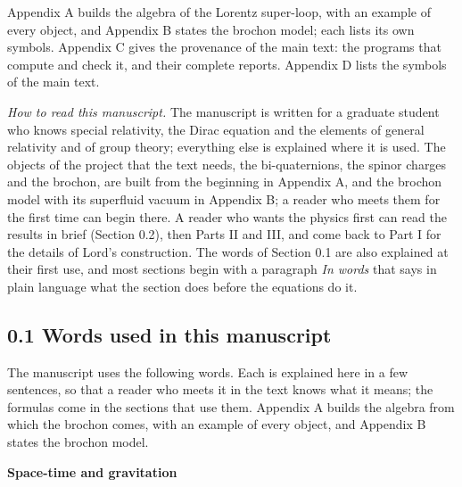 \documentclass[
  10pt,
]{article}
\begin{document}
Appendix A builds the algebra of the Lorentz super-loop, with an example
of every object, and Appendix B states the brochon model; each lists its
own symbols. Appendix C gives the provenance of the main text: the
programs that compute and check it, and their complete reports. Appendix
D lists the symbols of the main text.

\emph{How to read this manuscript.} The manuscript is written for a
graduate student who knows special relativity, the Dirac equation and
the elements of general relativity and of group theory; everything else
is explained where it is used. The objects of the project that the text
needs, the bi-quaternions, the spinor charges and the brochon, are built
from the beginning in Appendix A, and the brochon model with its
superfluid vacuum in Appendix B; a reader who meets them for the first
time can begin there. A reader who wants the physics first can read the
results in brief (Section 0.2), then Parts II and III, and come back to
Part I for the details of Lord's construction. The words of Section 0.1
are also explained at their first use, and most sections begin with a
paragraph \emph{In words} that says in plain language what the section
does before the equations do it.

\hypertarget{words-used-in-this-manuscript}{%
\subsection{0.1 Words used in this
manuscript}\label{words-used-in-this-manuscript}}

The manuscript uses the following words. Each is explained here in a few
sentences, so that a reader who meets it in the text knows what it
means; the formulas come in the sections that use them. Appendix A
builds the algebra from which the brochon comes, with an example of
every object, and Appendix B states the brochon model.

\textbf{Space-time and gravitation}
\end{document}
